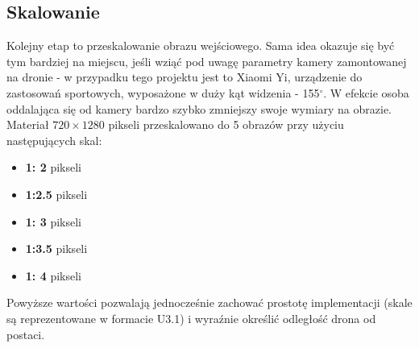 \subsection{Skalowanie}
Kolejny etap to przeskalowanie obrazu wejściowego. Sama idea okazuje się być tym bardziej na miejscu, jeśli wziąć pod uwagę parametry kamery zamontowanej na dronie - w przypadku tego projektu jest to Xiaomi Yi, urządzenie do zastosowań sportowych, wyposażone w duży kąt widzenia - 155$^{\circ}$. W efekcie osoba oddalająca się od kamery bardzo szybko zmniejszy swoje wymiary na obrazie. Materiał $720\times 1280$ pikseli przeskalowano do 5 obrazów przy użyciu następujących skal:
\begin{itemize}
	\item \textbf{1:  2}\tab{:} pikseli
	\item \textbf{1:2.5}\tab{:} pikseli	
	\item \textbf{1:  3}\tab{:} pikseli
	\item \textbf{1:3.5}\tab{:} pikseli
	\item \textbf{1:  4}\tab{:} pikseli
\end{itemize}
Powyższe wartości pozwalają jednocześnie zachować prostotę implementacji (skale są reprezentowane w formacie U3.1) i wyraźnie określić odległość drona od postaci. 

